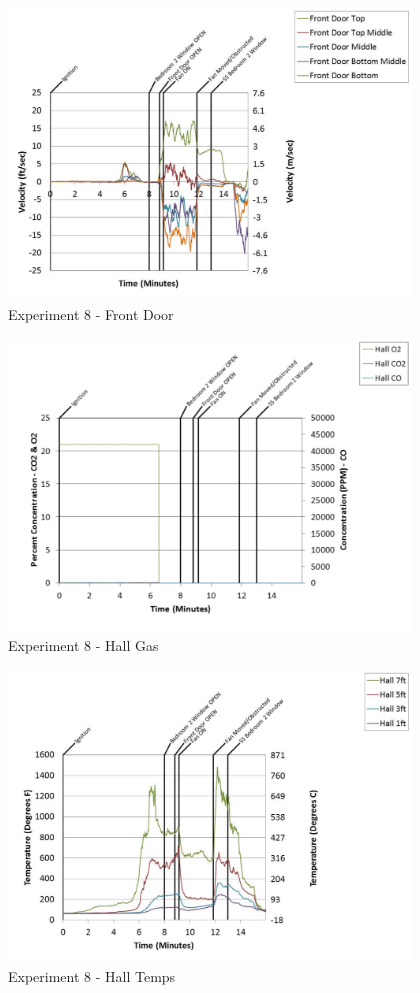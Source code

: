 \documentclass{article}
\begin{document}
\begin{appendices}
	\begin{figure}[h!]
		\centering
		\includegraphics[height=3.05in]{0_Images/Results_Charts/Exp_8_Charts/FrontDoor.pdf}
		\caption{Experiment 8 - Front Door}
	\end{figure}
 
	\clearpage

	\begin{figure}[h!]
		\centering
		\includegraphics[height=3.05in]{0_Images/Results_Charts/Exp_8_Charts/HallGas.pdf}
		\caption{Experiment 8 - Hall Gas}
	\end{figure}
 

	\begin{figure}[h!]
		\centering
		\includegraphics[height=3.05in]{0_Images/Results_Charts/Exp_8_Charts/HallTemps.pdf}
		\caption{Experiment 8 - Hall Temps}
	\end{figure}
 

\end{appendices}
\end{document}
